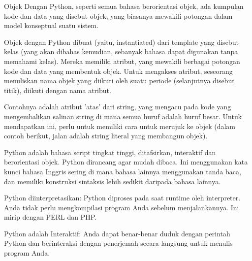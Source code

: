 \vspace{14pt}
\noindent 
{\fontsize{14pt}{14pt}\selectfont Objek Dengan Python, seperti semua bahasa berorientasi objek, ada kumpulan kode dan data yang disebut objek, yang biasanya mewakili potongan dalam model konseptual suatu sistem. \\} \par
\vspace{14pt}
\noindent 
{\fontsize{14pt}{14pt}\selectfont Objek dengan Python dibuat (yaitu, instantiated) dari template yang disebut kelas (yang akan dibahas kemudian, sebanyak bahasa dapat digunakan tanpa memahami kelas). Mereka memiliki atribut, yang mewakili berbagai potongan kode dan data yang membentuk objek. Untuk mengakses atribut, seseorang menuliskan nama objek yang diikuti oleh suatu periode (selanjutnya disebut titik), diikuti dengan nama atribut. \\} \par
\vspace{14pt}
\noindent 
{\fontsize{14pt}{14pt}\selectfont Contohnya adalah atribut 'atas' dari string, yang mengacu pada kode yang mengembalikan salinan string di mana semua huruf adalah huruf besar. Untuk mendapatkan ini, perlu untuk memiliki cara untuk merujuk ke objek (dalam contoh berikut, jalan adalah string literal yang membangun objek). \\} \par
\noindent 
{\fontsize{14pt}{14pt}\selectfont Python adalah bahasa script tingkat tinggi, ditafsirkan, interaktif dan berorientasi objek. Python dirancang agar mudah dibaca. Ini menggunakan kata kunci bahasa Inggris sering di mana bahasa lainnya menggunakan tanda baca, dan memiliki konstruksi sintaksis lebih sedikit daripada bahasa lainnya. \\} \par
\vspace{14pt}
\noindent 
{\fontsize{14pt}{14pt}\selectfont Python diinterpretasikan: Python diproses pada saat runtime oleh interpreter. Anda tidak perlu mengkompilasi program Anda sebelum menjalankannya. Ini mirip dengan PERL dan PHP. \\} \par
\vspace{14pt}
\noindent 
{\fontsize{14pt}{14pt}\selectfont Python adalah Interaktif: Anda dapat benar-benar duduk dengan perintah Python dan berinteraksi dengan penerjemah secara langsung untuk menulis program Anda. \\} \par
\vspace{14pt}
